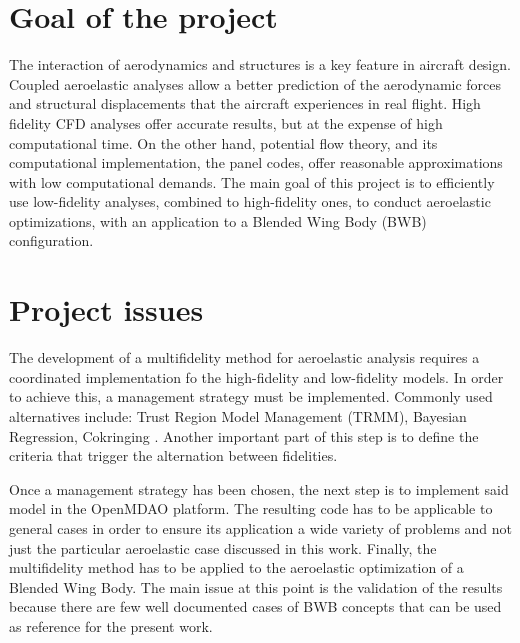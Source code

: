 \section{Goal of the project}
\label{sec:goalofproject}

The interaction of aerodynamics and structures is a key feature in aircraft design. Coupled aeroelastic analyses allow a better prediction of the aerodynamic forces and structural displacements that the aircraft experiences in real flight. High fidelity CFD analyses offer accurate results, but at the expense of high computational time. On the other hand, potential flow theory, and its computational implementation, the panel codes, offer reasonable approximations with low computational demands. The main goal of this project is to efficiently use low-fidelity analyses, combined to high-fidelity ones, to conduct aeroelastic optimizations, with an application to a Blended Wing Body (BWB) configuration.

\section{Project issues}
\label{sec:projectissues}
The development of a multifidelity method for aeroelastic analysis requires a coordinated implementation fo the high-fidelity and low-fidelity models. In order to achieve this, a management strategy must be implemented. Commonly used alternatives include: Trust Region Model Management (TRMM), Bayesian Regression, Cokringing \cite{peherstorfer2018survey}. Another important part of this step is to define the criteria that trigger the alternation between fidelities.

Once a management strategy has been chosen, the next step is to implement said model in the OpenMDAO platform. The resulting code has to be applicable to general cases in order to ensure its application a wide variety of problems and not just the particular aeroelastic case discussed in this work. Finally, the multifidelity method has to be applied to the aeroelastic optimization of a Blended Wing Body. The main issue at this point is the validation of the results because there are few well documented cases of BWB concepts that can be used as reference for the present work. 


